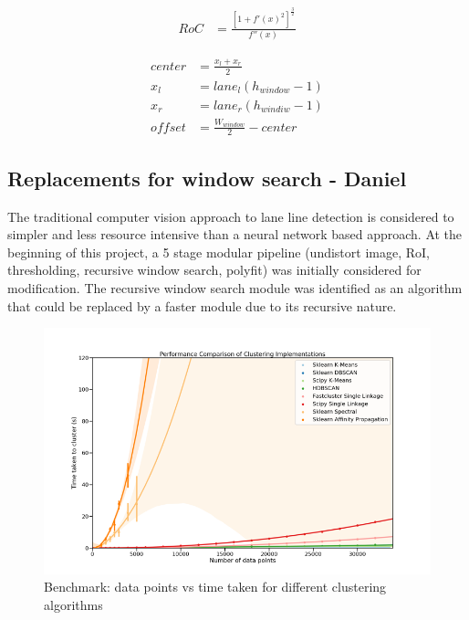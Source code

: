 \documentclass[twoside,twocolumn]{article}
\begin{document}
\begin{align} \label{eq:ROC}
RoC &= \frac{[1 + f'(x)^2]^\frac{3}{2}}{f''(x)}
\end{align}

\begin{subequations}
\begin{align}
center &= \frac{x_{l} + x_{r}}{2} \\
x_{l} &= lane_{l}(h_{window} - 1) \\
x_{r} &= lane_{r}(h_{windiw} - 1) \\
offset &= \frac{W_{window}}{2} - center \label{eq:offset}
\end{align}
\end{subequations}

\subsection{Replacements for window search - Daniel}

\par The traditional computer vision approach to lane line detection is considered to simpler and less resource intensive than a neural network based approach. At the beginning of this project, a 5 stage modular pipeline (undistort image, RoI, thresholding, recursive window search, polyfit) was initially considered for modification. The recursive window search module was identified as an algorithm that could be replaced by a faster module due to its recursive nature.

\begin{figure}
  \includegraphics[width=\linewidth]{daniel1.png}
  \caption{Benchmark: data points vs time taken for different clustering algorithms}
  \label{fig:d1}
\end{figure}
\end{document}
